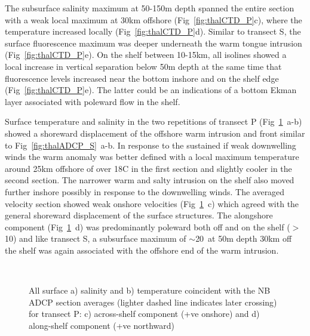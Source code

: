 The subsurface salinity maximum at 50-150m depth spanned the
entire section with a weak local maximum  at 30km offshore
(Fig~\ref{fig:thalCTD_P}c), where the temperature increased
locally (Fig~\ref{fig:thalCTD_P}d). Similar to transect S, the
surface fluorescence maximum was deeper underneath the warm tongue
intrusion (Fig~\ref{fig:thalCTD_P}e). On the shelf between
10-15km, all isolines showed a local increase in vertical
separation below 50m depth at the same time that fluorescence
levels increased near the bottom inshore and on the shelf edge
(Fig~\ref{fig:thalCTD_P}e). The latter could be an indications of
a bottom Ekman layer associated with poleward flow in the shelf.

Surface temperature and salinity in the two repetitions of
transect P (Fig~\ref{fig:thalADCP_P}~a-b) showed a shoreward
displacement of the offshore warm intrusion and front similar to
Fig~\ref{fig:thalADCP_S}~a-b. In response to the sustained if weak
downwelling winds the warm anomaly was better defined with a local
maximum temperature around 25km offshore of over 18\deg C in the
first section and slightly cooler in the second section. The
narrower warm and salty intrusion on the shelf also moved further
inshore possibly in response to the downwelling winds. The
averaged velocity section showed weak onshore velocities
(Fig~\ref{fig:thalADCP_P}~c) which agreed with the general
shoreward displacement of the surface structures. The alongshore
component (Fig~\ref{fig:thalADCP_P}~d) was predominantly poleward
both off and on the shelf ($>$10\velc) and like transect S, a
subsurface maximum of $\sim$20\velc\, at 50m depth 30km off the
shelf was again associated with the offshore end of the warm
intrusion.
\begin{figure}[t]
\arribacap \centering \hspace*{-0.2cm}%
\hspace*{0.1cm}
\hspace*{0.8cm}\\
\hspace*{0.5cm}%
%
\caption{All surface a) salinity and b) temperature coincident
with the NB ADCP section averages (lighter dashed line indicates
later crossing) for transect P: c) across-shelf component (+ve
onshore) and d) along-shelf component (+ve northward)}
\label{fig:thalADCP_P}
\end{figure}

